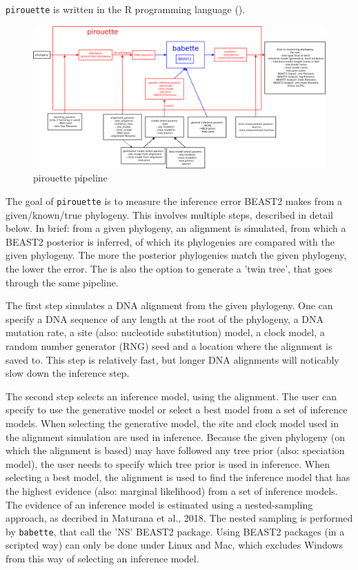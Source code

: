 \documentclass{article}
\begin{document}
\verb;pirouette; is written in the R programming language (\cite{R}).

\begin{figure}
  \centering
  \includegraphics[width=\textwidth]{overview.png}
  \caption{pirouette pipeline}
  \label{fig:pipeline}
\end{figure}

The goal of \verb;pirouette; is to measure the inference error BEAST2
makes from a given/known/true phylogeny. This involves multiple steps,
described in detail below. 
In brief: from a given phylogeny, an alignment is simulated, from which a BEAST2
posterior is inferred, of which its phylogenies are compared with the given
phylogeny. The more the posterior phylogenies match the given phylogeny,
the lower the error. The is also the option to generate a 'twin tree',
that goes through the same pipeline.

The first step simulates a DNA alignment from the given phylogeny.
One can specify a DNA sequence
of any length at the root of the phylogeny, a DNA mutation rate, a
site (also: nucleotide substitution) model, 
a clock model, a random number generator (RNG) seed and a location
where the alignment is saved to. This step is relatively fast, but longer
DNA alignments will noticably slow down the inference step.

The second step selects an inference model, using the alignment.
The user can specify to use the generative model or select a best model
from a set of inference models. 
When selecting the generative model,
the site and clock model used in the alignment simulation are used
in inference. Because the given phylogeny (on which the alignment is based)
may have followed any tree prior (also: speciation model), the user needs
to specify which tree prior is used in inference. 
When selecting a best
model, the alignment is used to find the inference model that has the
highest evidence (also: marginal likelihood) from a set of inference models.
The evidence of an inference model is estimated using a nested-sampling
approach, as decribed in Maturana et al., 2018. The nested sampling is
performed by \verb;babette;, that call the 'NS' BEAST2 package. 
Using BEAST2 packages (in a scripted way) can only be done under Linux and Mac,
which excludes Windows from this way of selecting an inference model.
\end{document}
